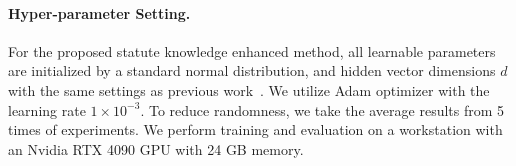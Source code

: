 

\vspace{-0.5em}
\paragraph{Hyper-parameter Setting.}

For the proposed statute knowledge enhanced method, all learnable parameters are initialized by a standard normal distribution, and hidden vector dimensions $d$ with the same settings as previous work~\cite{neurjudge}. We utilize Adam optimizer with the learning rate $1\times 10^{-3}$. To reduce randomness, we take the average results from 5 times of experiments. 
We perform training and evaluation on a workstation with an Nvidia RTX 4090 GPU with 24 GB memory. 





